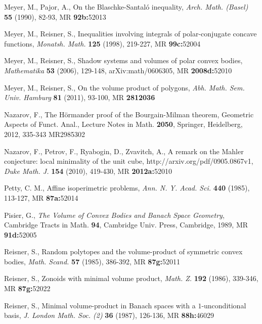 \documentclass[12pt]{article}
\begin{document}
\begin{thebibliography}{999999}
Meyer, M., Pajor, A.,
On the Blaschke-Santal\'o inequality,
{\it{Arch. Math. (Basel)}}\, {\bf{55}} (1990), 
82-93, MR {\bf{92b:}}{\rm{52013}}

Meyer, M., Reisner, S.,
Inequalities involving integrals of polar-conjugate concave functions,
{\it{Monatsh. Math.}} {\bf{125}} (1998), 219-227, 
MR {\bf{99c:}}{\rm{52004}} 

Meyer, M., Reisner, S.,
Shadow systems and volumes of polar convex bodies,
{\it{Mathematika}} {\bf{53}} (2006), 129-148, arXiv:math/0606305,
MR {\bf{2008d:}}{\rm{52010}} 

Meyer, M., Reisner, S.,
On the volume product of polygons, 
{\it{Abh. Math. Sem. Univ. Hamburg}} {\bf{81}} (2011), 93-100, 
MR {\bf{2812036}}

Nazarov, F.,
The H\"ormander proof of the Bourgain-Milman theorem,
Geometric Aspects of Funct. Anal., 
Lecture Notes in Math. {\bf{2050}}, Springer, 
Heidelberg, 2012, 335-343 
MR2985302

Nazarov, F., Petrov, F., Ryabogin, D., Zvavitch, A.,
A remark on the Mahler conjecture: local minimality of the unit cube, 
http://arxiv.org/pdf/0905.0867v1,
{\it{Duke Math. J.}} {\bf{154}} (2010), 419-430,
MR {\bf{2012a:}}{\rm{52010}} 

Petty, C. M.,
Affine isoperimetric problems,
{\it{Ann. N. Y. Acad. Sci.}} {\bf{440}} 
(1985), 113-127, MR {\bf{87a:}}{\rm{52014}}

Pisier, G.,
{\it{The Volume of Convex Bodies and Banach Space Geometry}}, Cambridge Tracts
in Math. {\bf{94}}, Cambridge Univ. Press, Cambridge, 1989,
MR {\bf{91d:}}{\rm{52005}} 

Reisner, S.,
Random polytopes and the volume-product of symmetric convex bodies,
{\it{Math. Scand.}} {\bf{57}} (1985), 386-392, MR {\bf{87g:}}{\rm{52011}} 

Reisner, S.,
Zonoids with minimal volume product,
{\it{Math. Z.}} {\bf{192}} (1986), 339-346, MR {\bf{87g:}}{\rm{52022}} 

Reisner, S.,
Minimal volume-product in Banach spaces with a $1$-unconditional basis,
{\it{J. London Math. Soc. (2)}} {\bf{36}} 
(1987), 126-136, MR {\bf{88h:}}{\rm{46029}}


\end{thebibliography}
\end{document}
